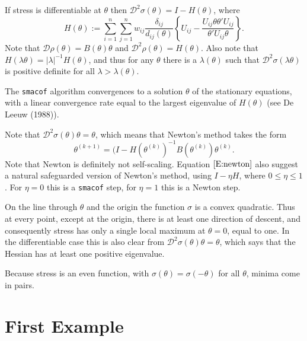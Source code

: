 \documentclass[
  12pt,
]{article}
\begin{document}
If stress is differentiable at \(\theta\) then \(\mathcal{D}^2\sigma(\theta)=I-H(\theta)\),
where
\begin{equation}
H(\theta):=\sum_{i=1}^n\sum_{j=1}^nw_{ij}\frac{\delta_{ij}}{d_{ij}(\theta)}\left\{U_{ij}-\frac{U_{ij}\theta\theta'U_{ij}}{\theta'U_{ij}\theta}\right\}.
\end{equation}
Note that \(\mathcal{D}\rho(\theta)=B(\theta)\theta\) and \(\mathcal{D}^2\rho(\theta)=H(\theta)\). Also note that \(H(\lambda\theta)=|\lambda|^{-1}H(\theta)\),
and thus for any \(\theta\) there is a \(\lambda(\theta)\) such that \(\mathcal{D}^2\sigma(\lambda\theta)\) is positive definite for all \(\lambda>\lambda(\theta)\).

The \texttt{smacof} algorithm convergences to a solution \(\theta\) of the stationary equations, with a linear convergence rate equal to the largest eigenvalue of \(H(\theta)\)
(see De Leeuw (1988)).

Note that \(\mathcal{D}^2\sigma(\theta)\theta=\theta\), which means that Newton's method takes the form
\begin{equation}
\theta^{(k+1)}=(I-H(\theta^{(k)})^{-1}B(\theta^{(k)})\theta^{(k)}.\label{E:newton}
\end{equation}
Note that Newton is definitely not self-scaling. Equation \(\eqref{E:newton}\) also suggest a natural safeguarded version of Newton's method, using
\(I-\eta H\), where \(0\leq\eta\leq 1\). For \(\eta=0\) this is a \texttt{smacof} step, for \(\eta=1\) this is a Newton step.

On the line through \(\theta\) and the origin the function \(\sigma\) is a convex quadratic. Thus at every point, except at the origin, there is at least one direction of descent, and consequently stress has only a single local maximum at \(\theta=0\), equal to one. In the differentiable case this is also clear from \(\mathcal{D}^2\sigma(\theta)\theta=\theta\), which says that the Hessian has at least one positive eigenvalue.

Because stress is an even function, with \(\sigma(\theta)=\sigma(-\theta)\) for all \(\theta\), minima come in pairs.

\section{First Example}\label{first-example}
\end{document}
